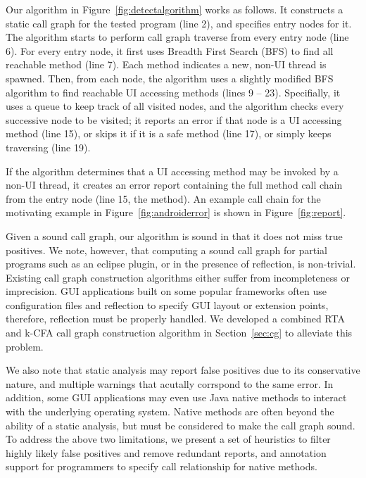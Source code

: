 Our algorithm in Figure~\ref{fig:detectalgorithm} works as follows. It
constructs a static call graph for the tested program (line 2),
and specifies entry nodes for it. The algorithm starts to perform
call graph traverse from every entry node (line 6). For every entry node,
it first uses Breadth First Search (BFS) to find all reachable
 method (line 7). Each  method
indicates a new, non-UI thread is spawned.  Then, from each
 node, the algorithm uses a slightly modified 
BFS algorithm to find reachable UI accessing methods (lines 9 -- 23).
Specifially, it uses a queue to keep track of all visited nodes, and
the algorithm checks every successive node to be visited;
it reports an error if that node
is a UI accessing method (line 15), or skips it if it is
a safe method (line 17), or simply keeps traversing (line 19).

If the algorithm determines that a UI accessing method may be invoked
by a non-UI thread, it creates an error report containing the full
method call chain from the entry node (line 15, the 
method). An example call chain for
the motivating example in Figure~\ref{fig:androiderror} is shown
in Figure~\ref{fig:report}.

Given a sound call graph, our algorithm is sound in that it does not
miss true positives. We note, however, that computing a sound
call graph for partial programs such as an eclipse plugin,
or in the presence of reflection, is non-trivial. Existing
call graph construction algorithms either suffer from incompleteness
or imprecision. GUI applications built on some popular frameworks
often use configuration files and reflection to specify GUI layout
or extension points, therefore, reflection must be properly handled.
We developed a combined RTA
and k-CFA call graph construction algorithm in Section~\ref{sec:cg}
to alleviate this problem.


We also note that static analysis may report false positives due
to its conservative nature, and multiple warnings that acutally corrspond to
the same error. In addition, some GUI applications may even use
Java native methods to interact with the underlying operating system.
Native methods are often beyond the ability of a static analysis, but
must be considered to make the call graph sound. To address the
above two limitations, we present a set of heuristics to filter
highly likely false positives and remove redundant reports, and annotation
support for programmers to specify call relationship for native methods.


